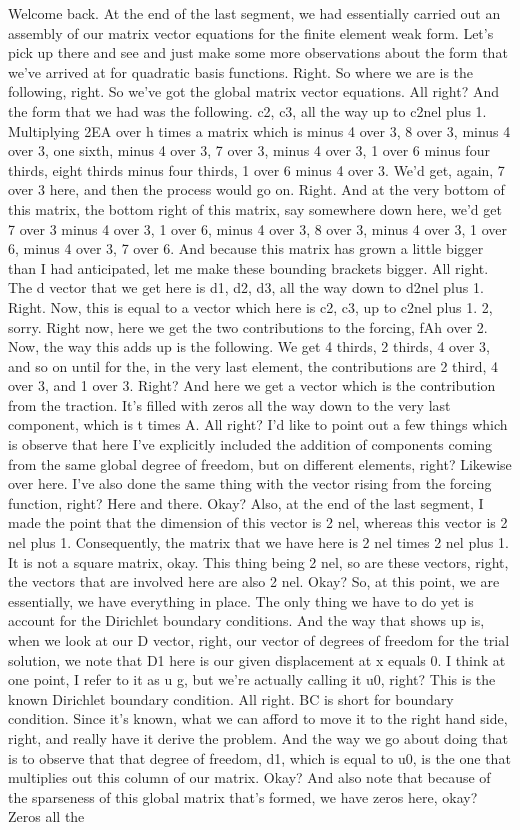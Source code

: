 \documentclass[10pt]{article}
\begin{document}
{Welcome back. At the end of the last segment, we had essentially carried out an assembly of our matrix vector equations for the finite element weak form. Let's pick up there and see and just make some more observations about the form that we've arrived at for quadratic basis functions. Right. So where we are is the following, right. So we've got the global matrix vector equations. All right? And the form that we had was the following. c2, c3, all the way up to c2nel plus 1. Multiplying 2EA over h times a matrix which is minus 4 over 3, 8 over 3, minus 4 over 3, one sixth, minus 4 over 3, 7 over 3, minus 4 over 3, 1 over 6 minus four thirds, eight thirds minus four thirds, 1 over 6 minus 4 over 3. We'd get, again, 7 over 3 here, and then the process would go on. Right. And at the very bottom of this matrix, the bottom right of this matrix, say somewhere down here, we'd get 7 over 3 minus 4 over 3, 1 over 6, minus 4 over 3, 8 over 3, minus 4 over 3, 1 over 6, minus 4 over 3, 7 over 6. And because this matrix has grown a little bigger than I had anticipated, let me make these bounding brackets bigger. All right. The d vector that we get here is d1, d2, d3, all the way down to d2nel plus 1. Right. Now, this is equal to a vector which here is c2, c3, up to c2nel plus 1. 2, sorry. Right now, here we get the two contributions to the forcing, fAh over 2. Now, the way this adds up is the following. We get 4 thirds, 2 thirds, 4 over 3, and so on until for the, in the very last element, the contributions are 2 third, 4 over 3, and 1 over 3. Right? And here we get a vector which is the contribution from the traction. It's filled with zeros all the way down to the very last component, which is t times A. All right? I'd like to point out a few things which is observe that here I've explicitly included the addition of components coming from the same global degree of freedom, but on different elements, right? Likewise over here. I've also done the same thing with the vector rising from the forcing function, right? Here and there. Okay? Also, at the end of the last segment, I made the point that the dimension of this vector is 2 nel, whereas this vector is 2 nel plus 1. Consequently, the matrix that we have here is 2 nel times 2 nel plus 1. It is not a square matrix, okay. This thing being 2 nel, so are these vectors, right, the vectors that are involved here are also 2 nel. Okay? So, at this point, we are essentially, we have everything in place. The only thing we have to do yet is account for the Dirichlet boundary conditions. And the way that shows up is, when we look at our D vector, right, our vector of degrees of freedom for the trial solution, we note that D1 here is our given displacement at x equals 0. I think at one point, I refer to it as u g, but we're actually calling it u0, right? This is the known Dirichlet boundary condition. All right. BC is short for boundary condition. Since it's known, what we can afford to move it to the right hand side, right, and really have it derive the problem. And the way we go about doing that is to observe that that degree of freedom, d1, which is equal to u0, is the one that multiplies out this column of our matrix. Okay? And also note that because of the sparseness of this global matrix that's formed, we have zeros here, okay? Zeros all the }
\end{document}
